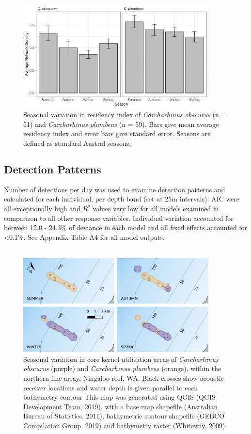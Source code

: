 \documentclass[11pt,a4paper]{article}
\begin{document}
	
	\begin{figure}[h!]
		\centering\includegraphics[width=0.9\textwidth]{../Results/network_season.pdf}
		\caption{Seasonal variation in residency index of \textit{Carcharhinus obscurus} (n = 51) and \textit{Carcharhinus plumbeus} (n = 59). Bars give mean average residency index and error bars give standard error. Seasons are defined as standard Austral seasons.}
		\label{ri_seasons}
	\end{figure}		


	\subsection{Detection Patterns}
	
	Number of detections per day was used to examine detection patterns and calculated for each individual, per depth band (set at 25m intervals). AIC were all exceptionally high and $R^2$ values very low for all models examined in comparison to all other response variables. Individual variation accounted for between 12.0 - 24.3\% of deviance in each model and all fixed effects accounted for \textless0.1\%. See Appendix Table A4 for all model outputs.\\
	\\
	
	\begin{figure}[h!]
		\centering\includegraphics[width=0.9\textwidth]{../Results/north.pdf}
		\caption{Seasonal variation in core kernel utilisation areas of \textit{Carcharhinus obscurus} (purple) and \textit{Carcharhinus plumbeus} (orange), within the northern line array, Ningaloo reef, WA. Black crosses show acoustic receiver locations and water depth is given parallel to each bathymetry contour This map was generated using QGIS (QGIS Development Team, 2019), with a base map shapefile (Australian Bureau of Statistics, 2011), bathymetric contour shapefile (GEBCO Compilation Group, 2019) and bathymetry raster (Whiteway, 2009).}
		\label{depth_north}
	\end{figure}		
	
\end{document}
